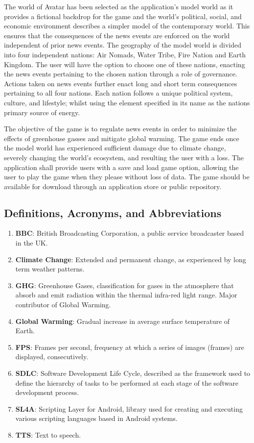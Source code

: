 \documentclass[]{article}
\begin{document}
The world of Avatar has been selected as the application's model world as it provides a fictional backdrop for the game and the world's political, social, and economic environment describes a simpler model of the contemporary world. This ensures that the consequences of the news events are enforced on the world independent of prior news events. \cite{WoA}The geography of the model world is divided into four independent nations: Air Nomads, Water Tribe, Fire Nation and Earth Kingdom. The user will have the option to choose one of these nations, enacting the news events pertaining to the chosen nation through a role of governance. Actions taken on news events further enact long and short term consequences pertaining to all four nations. Each nation follows a unique political system, culture, and lifestyle; whilst using the element specified in its name as the nations primary source of energy. 

The objective of the game is to regulate news events in order to minimize the effects of greenhouse gasses and mitigate global warming. The game ends once the model world has experienced sufficient damage due to climate change, severely changing the world's ecosystem, and resulting the user with a loss. The application shall provide users with a save and load game option, allowing the user to play the game when they please without loss of data. The game should be available for download through an application store or public repository.	

\subsection{Definitions, Acronyms, and Abbreviations}
\label{sub:definitions_acronyms_and_abbreviations}
\begin{enumerate}
\item \textbf{BBC}: British Broadcasting Corporation, a public service broadcaster based in the UK.
\item \textbf{Climate Change}: Extended and permanent change, as experienced by long term weather patterns.
\item \textbf{GHG}: Greenhouse Gases, classification for gases in the atmosphere that absorb and emit radiation within the thermal infra-red light range. Major contributor of Global Warming.
\item \textbf{Global Warming}: Gradual increase in average surface temperature of Earth.
\item\textbf{FPS}: Frames per second,  frequency at which a series of images (frames) are displayed, consecutively.
\item \textbf{SDLC}: Software Development Life Cycle, described as the framework used to define the hierarchy of tasks to be performed at each stage of the software development process.
\item \textbf{SL4A}:  Scripting Layer for Android, library used for creating and executing various scripting languages based in Android systems.
\item \textbf{TTS}: Text to speech.
\end{enumerate}
\end{document}

